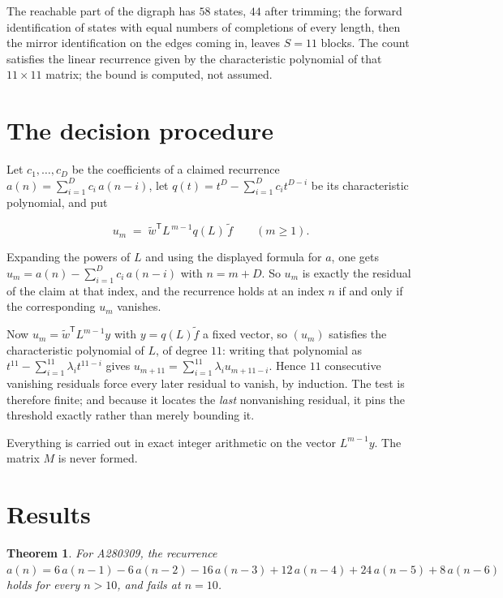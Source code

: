 \documentclass[11pt]{article}
\newtheorem{theorem}{Theorem}
\theoremstyle{definition}
\begin{document}
The reachable part of the digraph has $58$ states, $44$ after trimming; the forward identification of states with equal numbers of completions of every length, then the mirror identification on the edges coming in, leaves $S = 11$ blocks. The count satisfies the linear recurrence given by the characteristic polynomial of that $11\times11$ matrix; the bound is computed, not assumed.

\section{The decision procedure}

Let $c_1,\dots,c_D$ be the coefficients of a claimed recurrence $a(n) = \sum_{i=1}^{D} c_i\,a(n-i)$, let $q(t) = t^{D} - \sum_{i=1}^{D} c_i t^{D-i}$ be its characteristic polynomial, and put

\[u_m \;=\; \tilde w^{\mathsf T} L^{\,m-1} q(L)\,\tilde f \qquad (m \ge 1).\]

Expanding the powers of $L$ and using the displayed formula for $a$, one gets $u_m = a(n) - \sum_{i=1}^{D} c_i\,a(n-i)$ with $n = m + D$. So $u_m$ is exactly the residual of the claim at that index, and the recurrence holds at an index $n$ if and only if the corresponding $u_m$ vanishes.

Now $u_m = \tilde w^{\mathsf T} L^{m-1} y$ with $y = q(L)\tilde f$ a fixed vector, so $(u_m)$ satisfies the characteristic polynomial of $L$, of degree $11$: writing that polynomial as $t^{11} - \sum_{i=1}^{11} \lambda_i t^{11-i}$ gives $u_{m+11} = \sum_{i=1}^{11} \lambda_i u_{m+11-i}$. Hence $11$ consecutive vanishing residuals force every later residual to vanish, by induction. The test is therefore finite; and because it locates the {\itshape last} nonvanishing residual, it pins the threshold exactly rather than merely bounding it.

Everything is carried out in exact integer arithmetic on the vector $L^{m-1}y$. The matrix $M$ is never formed.

\section{Results}

\begin{theorem} For A280309, the recurrence $a(n) = 6\,a(n-1) - 6\,a(n-2) - 16\,a(n-3) + 12\,a(n-4) + 24\,a(n-5) + 8\,a(n-6)$ holds for every $n > 10$, and fails at $n = 10$.\end{theorem}
\end{document}
